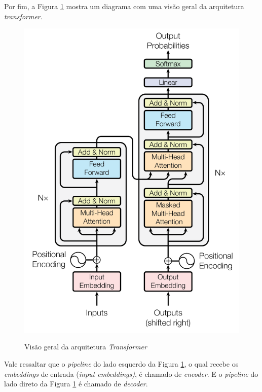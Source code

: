 Por fim, a Figura \ref{fig:transformer-architecture} mostra um diagrama com uma visão geral da arquitetura \textit{transformer}.

\begin{figure}[H]
    \centering
    \caption{Visão geral da arquitetura \textit{Transformer}}
    \includegraphics[scale=0.4]{imagens/conceitos/transformer-architecture.pdf}
    \label{fig:transformer-architecture}
\end{figure}

Vale ressaltar que o \textit{pipeline} do lado esquerdo da Figura \ref{fig:transformer-architecture}, o qual recebe os \textit{embeddings} de entrada (\textit{input embeddings)}, é chamado de \textit{encoder}. E o \textit{pipeline} do lado direto da Figura \ref{fig:transformer-architecture} é chamado de \textit{decoder}.

